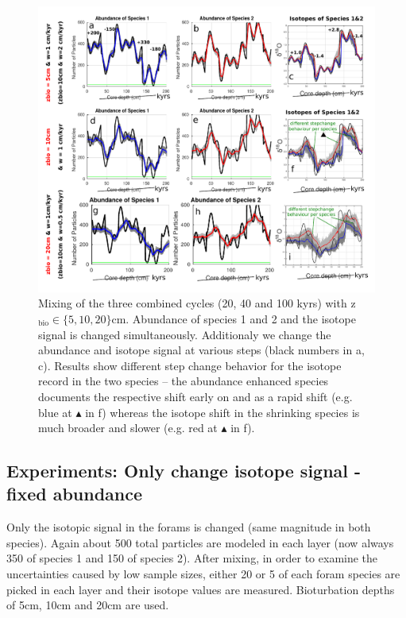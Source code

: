 \documentclass[a4paper,oneside,9pt]{article}
\begin{document}
\begin{figure}[hbp]
\begin{center}
	\includegraphics[width=1.0\textwidth]{../figures/../figures/Allcycles_combined_stepevent_bigger_5+10+20cm_background.pdf}
	\caption{Mixing of the three combined cycles (20, 40 and 100 kyrs) with z$_\mathrm{bio} \in \{5,10,20 \}$cm. Abundance of species 1 and 2 and the isotope signal is changed simultaneously. Additionaly we change the abundance and isotope signal 
	at various steps (black numbers in a, c). Results show different step change behavior for the isotope record in the two species -- the abundance enhanced species documents the respective shift early on and as a rapid shift 
	(e.g. blue at $\blacktriangle$ in f) whereas the isotope shift in the shrinking species is much broader and slower (e.g. red at $\blacktriangle$ in f).}\label{fig:5pointevent}
\end{center}
\end{figure}


\newpage
\subsection{Experiments: Only change isotope signal - fixed abundance}
Only the isotopic signal in the forams is changed (same magnitude in both species). Again about 500 total particles are modeled in each layer (now always 350 of species 1 and 150 of species 2). 
After mixing, in order to examine the uncertainties caused by low sample sizes, either 20 or 5 of each foram species are picked in each layer and their isotope values are measured.
Bioturbation depths of 5cm, 10cm and 20cm are used. 
\end{document}
